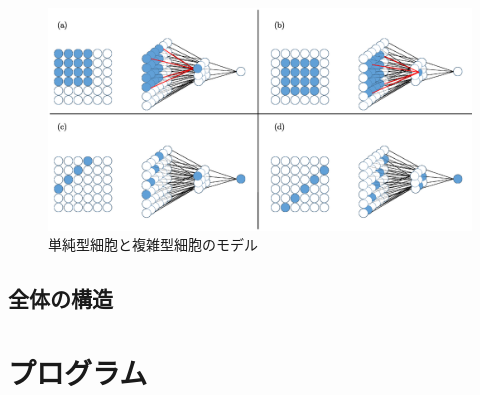 \documentclass[a4paper,10pt]{jsarticle}
\begin{document}
\begin{figure}[t]
 \centering
 \includegraphics[scale=0.4]{fig/eps/cnn62.eps}
  \caption{単純型細胞と複雑型細胞のモデル}
  \label{fig:単純型細胞と複雑型細胞のモデル}
\end{figure}

\subsection{全体の構造}

\section{プログラム}
\end{document}
